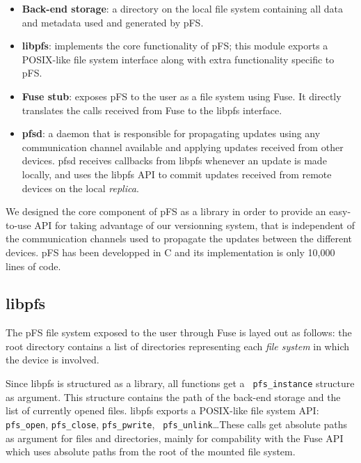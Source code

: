 \begin {itemize}
\item \textbf{Back-end storage}: a directory on the local file system
  containing all data and metadata used and generated by pFS.
\item \textbf{libpfs}: implements the core functionality of pFS; this
  module exports a POSIX-like file
  system interface along with extra functionality specific to pFS.
\item \textbf{Fuse stub}: exposes pFS to the user as a file system
  using Fuse. It directly translates the calls received from Fuse to
  the libpfs interface.
\item \textbf{pfsd}: a daemon that is responsible for propagating
  updates using any communication channel available and applying
  updates received from other devices. pfsd receives callbacks
  from libpfs whenever an update is made locally, and uses the libpfs API
  to commit updates received from remote devices on the local
  \emph{replica}.
\end {itemize}

We designed the core component of pFS as a library in order to provide
an easy-to-use API for taking advantage of our versionning system,
that is independent of the communication channels used to propagate
the updates between the different devices. pFS has been developped in C 
and its implementation is only 10,000 lines of code.

\subsection {libpfs}

The pFS file system exposed to the user through Fuse is layed
out as follows: the root directory contains a list of directories
representing each \emph{file system} in which the device is
involved. 

Since libpfs is structured as a library, all functions get a {\tt
  pfs\_instance} structure as argument. This structure contains the
path of the back-end storage and the list of currently opened
files. libpfs exports a POSIX-like file system API: {\tt
  pfs\_open}, {\tt pfs\_close}, {\tt pfs\_pwrite}, {\tt
  pfs\_unlink}\ldots These calls get absolute paths as argument for
files and directories, mainly for compability with the Fuse API which
uses absolute paths from the root of the mounted file system.

